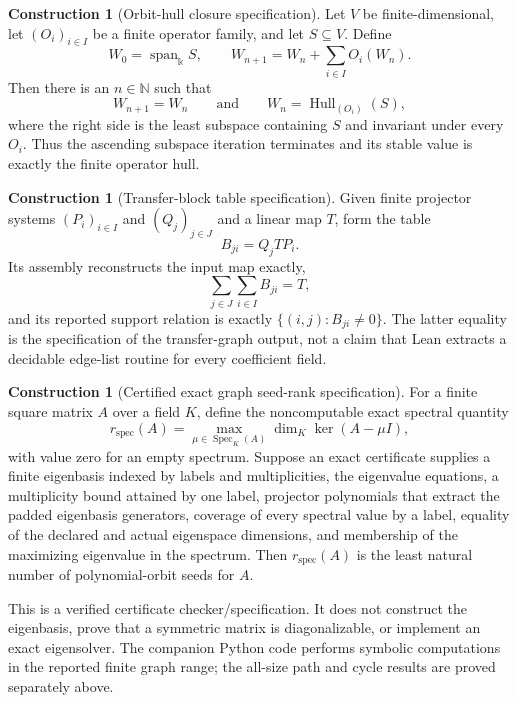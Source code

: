 \documentclass[11pt]{article}
\theoremstyle{definition}
\newtheorem{construction}[theorem]{Construction}
\theoremstyle{remark}
\newcommand{\Hull}{\operatorname{Hull}}
\newcommand{\Span}{\operatorname{span}}
\newcommand{\Spec}{\operatorname{Spec}}
\newcommand{\bbk}{\mathbb{k}}
\newcommand{\N}{\mathbb N}
\begin{document}
\begin{construction}[Orbit-hull closure specification]
\label{con:orbit-hull-algorithm}
Let $V$ be finite-dimensional, let $(O_i)_{i\in I}$ be a finite operator
family, and let $S\subseteq V$.  Define
\[
W_0=\Span_{\bbk}S,
\qquad
W_{n+1}=W_n+\sum_{i\in I}O_i(W_n).
\]
Then there is an $n\in\N$ such that
\[
W_{n+1}=W_n
\qquad\text{and}\qquad
W_n=\Hull_{(O_i)}(S),
\]
where the right side is the least subspace containing $S$ and invariant under
every $O_i$.  Thus the ascending subspace iteration terminates and its stable
value is exactly the finite operator hull.
\end{construction}

\begin{construction}[Transfer-block table specification]
\label{con:transfer-block-algorithm}
Given finite projector systems $(P_i)_{i\in I}$ and $(Q_j)_{j\in J}$ and a
linear map $T$, form the table
\[
B_{ji}=Q_jTP_i.
\]
Its assembly reconstructs the input map exactly,
\[
\sum_{j\in J}\sum_{i\in I}B_{ji}=T,
\]
and its reported support relation is exactly
$\{(i,j):B_{ji}\ne0\}$.  The latter equality is the specification of the
transfer-graph output, not a claim that Lean extracts a decidable edge-list
routine for every coefficient field.
\end{construction}

\begin{construction}[Certified exact graph seed-rank specification]
\label{con:exact-graph-seed-rank}
For a finite square matrix $A$ over a field $K$, define the noncomputable exact
spectral quantity
\[
r_{\mathrm{spec}}(A)
=
\max_{\mu\in\Spec_K(A)}
\dim_K\ker(A-\mu I),
\]
with value zero for an empty spectrum.  Suppose an exact certificate supplies
a finite eigenbasis indexed by labels and multiplicities, the eigenvalue
equations, a multiplicity bound attained by one label, projector polynomials
that extract the padded eigenbasis generators, coverage of every spectral
value by a label, equality of the declared and actual eigenspace dimensions,
and membership of the maximizing eigenvalue in the spectrum.  Then
$r_{\mathrm{spec}}(A)$ is the least natural number of polynomial-orbit seeds
for $A$.

This is a verified certificate checker/specification.  It does not construct
the eigenbasis, prove that a symmetric matrix is diagonalizable, or implement
an exact eigensolver.  The companion Python code performs symbolic
computations in the reported finite graph range; the all-size path and cycle
results are proved separately above.
\end{construction}
\end{document}
